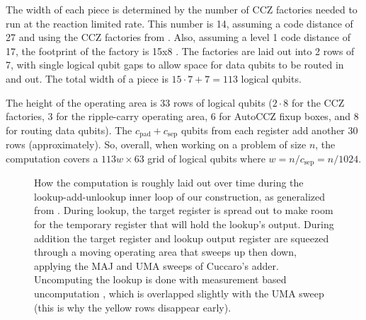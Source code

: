 \documentclass[superscriptaddress,notitlepage,longbibliography]{revtex4-1}
\theoremstyle{definition}
\theoremstyle{definition}
\newcommand{\gsep}{{c_{\text{sep}}}}
\newcommand{\gpad}{{c_{\text{pad}}}}
\begin{document}
The width of each piece is determined by the number of CCZ factories needed to run at the reaction limited rate.
This number is 14, assuming a code distance of 27 and using the CCZ factories from \cite{gidney2019autoccz, gidney2018magic}.
Also, assuming a level 1 code distance of 17, the footprint of the factory is 15x8 \cite{gidney2019autoccz}.
The factories are laid out into 2 rows of 7, with single logical qubit gaps to allow space for data qubits to be routed in and out.
The total width of a piece is $15\cdot 7 + 7 = 113$ logical qubits.

The height of the operating area is 33 rows of logical qubits ($2 \cdot 8$ for the CCZ factories, 3 for the ripple-carry operating area, 6 for AutoCCZ fixup boxes, and 8 for routing data qubits).
The $\gpad + \gsep$ qubits from each register add another 30 rows (approximately).
So, overall, when working on a problem of size $n$, the computation covers a $113w \times 63$ grid of logical qubits where $w=n/\gsep=n/1024$.


\begin{figure}
    \label{fig:time-bars}
    \caption{
        How the computation is roughly laid out over time during the lookup-add-unlookup inner loop of our construction, as generalized from \cite{gidney2019autoccz}.
        During lookup, the target register is spread out to make room for the temporary register that will hold the lookup's output.
        During addition the target register and lookup output register are squeezed through a moving operating area that sweeps up then down, applying the MAJ and UMA sweeps of Cuccaro's adder.
        Uncomputing the lookup is done with measurement based uncomputation \cite{berry2019qubitization}, which is overlapped slightly with the UMA sweep (this is why the yellow rows disappear early).
    }
\end{figure}
\end{document}
